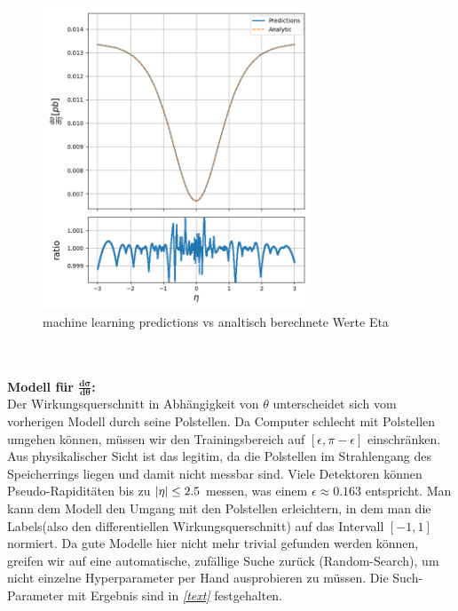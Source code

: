\begin{figure}[tbp]
	\centering
	\includegraphics[width=8cm]{graphics/partonic_eta_model_eta_ratio}
	\caption{machine learning predictions vs analtisch berechnete Werte Eta}
	\label{partonic_eta_model}
\end{figure}
 \\
 \\
\textbf{Modell für $\mathbf{\frac{d\sigma}{d\theta}}$:} \\
Der Wirkungsquerschnitt in Abhängigkeit von $\theta$ unterscheidet sich vom vorherigen Modell durch seine Polstellen. Da Computer schlecht mit Polstellen umgehen können, müssen wir den Trainingsbereich auf $[\epsilon, \pi-\epsilon]$ einschränken. Aus physikalischer Sicht ist das legitim, da die Polstellen im Strahlengang des Speicherrings liegen und damit nicht messbar sind. Viele Detektoren können Pseudo-Rapiditäten bis zu $\abs{\eta} \leq 2.5$ messen, was einem $\epsilon \approx 0.163$ entspricht. Man kann dem Modell den Umgang mit den Polstellen erleichtern, in dem man die Labels(also den differentiellen Wirkungsquerschnitt) auf das Intervall $[-1, 1]$ normiert. Da gute Modelle hier nicht mehr trivial gefunden werden können, greifen wir auf eine automatische, zufällige Suche zurück (Random-Search), um nicht einzelne Hyperparameter per Hand ausprobieren zu müssen. Die Such-Parameter mit Ergebnis sind in \textit{\autoref{text}} festgehalten.

